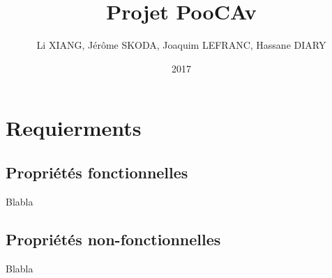 \documentclass[12pt]{article}
\title{Projet PooCAv}
\author{Li XIANG, Jérôme SKODA, Joaquim LEFRANC, Hassane DIARY}
\date{2017}
\begin{document}
\maketitle
\section{Requierments}

\subsection{Propriétés fonctionnelles}
Blabla

\subsection{Propriétés non-fonctionnelles}
Blabla
\end{document}
